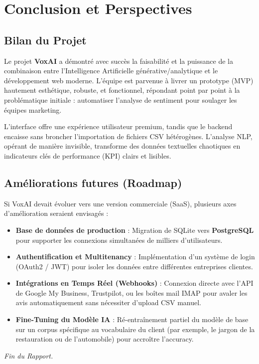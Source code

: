 \documentclass[12pt,a4paper]{article}
\begin{document}
\section{Conclusion et Perspectives}
\subsection{Bilan du Projet}
Le projet \textbf{VoxAI} a démontré avec succès la faisabilité et la puissance de la combinaison entre l'Intelligence Artificielle générative/analytique et le développement web moderne.
L'équipe est parvenue à livrer un prototype (MVP) hautement esthétique, robuste, et fonctionnel, répondant point par point à la problématique initiale : automatiser l'analyse de sentiment pour soulager les équipes marketing.

L'interface offre une expérience utilisateur premium, tandis que le backend encaisse sans broncher l'importation de fichiers CSV hétérogènes. L'analyse NLP, opérant de manière invisible, transforme des données textuelles chaotiques en indicateurs clés de performance (KPI) clairs et lisibles.

\subsection{Améliorations futures (Roadmap)}
Si VoxAI devait évoluer vers une version commerciale (SaaS), plusieurs axes d'amélioration seraient envisagés :
\begin{itemize}
    \item \textbf{Base de données de production} : Migration de SQLite vers \textbf{PostgreSQL} pour supporter les connexions simultanées de milliers d'utilisateurs.
    \item \textbf{Authentification et Multitenancy} : Implémentation d'un système de login (OAuth2 / JWT) pour isoler les données entre différentes entreprises clientes.
    \item \textbf{Intégrations en Temps Réel (Webhooks)} : Connexion directe avec l'API de Google My Business, Trustpilot, ou les boîtes mail IMAP pour avaler les avis automatiquement sans nécessiter d'upload CSV manuel.
    \item \textbf{Fine-Tuning du Modèle IA} : Ré-entraînement partiel du modèle de base sur un corpus spécifique au vocabulaire du client (par exemple, le jargon de la restauration ou de l'automobile) pour accroître l'accuracy.
\end{itemize}

\vspace{2cm}
\begin{center}
    \textit{Fin du Rapport.}
\end{center}
\end{document}
